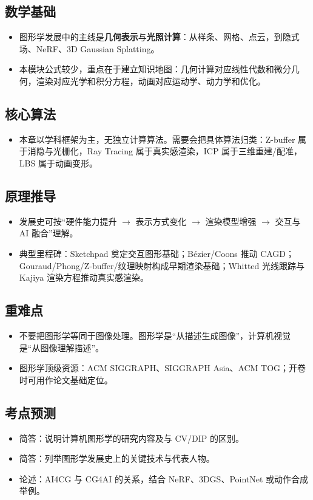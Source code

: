 \documentclass[UTF8,zihao=-4,scheme=chinese,fontset=fandol]{ctexart}
\newcommand{\key}[1]{\textbf{#1}}
\begin{document}
\subsection{数学基础}
\begin{itemize}
  \item 图形学发展中的主线是\key{几何表示}与\key{光照计算}：从样条、网格、点云，到隐式场、NeRF、3D Gaussian Splatting。
  \item 本模块公式较少，重点在于建立知识地图：几何计算对应线性代数和微分几何，渲染对应光学和积分方程，动画对应运动学、动力学和优化。
\end{itemize}

\subsection{核心算法}
\begin{itemize}
  \item 本章以学科框架为主，无独立计算算法。需要会把具体算法归类：Z-buffer 属于消隐与光栅化，Ray Tracing 属于真实感渲染，ICP 属于三维重建/配准，LBS 属于动画变形。
\end{itemize}

\subsection{原理推导}
\begin{itemize}
  \item 发展史可按“硬件能力提升 $\rightarrow$ 表示方式变化 $\rightarrow$ 渲染模型增强 $\rightarrow$ 交互与 AI 融合”理解。
  \item 典型里程碑：Sketchpad 奠定交互图形基础；Bézier/Coons 推动 CAGD；Gouraud/Phong/Z-buffer/纹理映射构成早期渲染基础；Whitted 光线跟踪与 Kajiya 渲染方程推动真实感渲染。
\end{itemize}

\subsection{重难点}
\begin{itemize}
  \item 不要把图形学等同于图像处理。图形学是“从描述生成图像”，计算机视觉是“从图像理解描述”。
  \item 图形学顶级资源：ACM SIGGRAPH、SIGGRAPH Asia、ACM TOG；开卷时可用作论文基础定位。
\end{itemize}

\subsection{考点预测}
\begin{itemize}
  \item 简答：说明计算机图形学的研究内容及与 CV/DIP 的区别。
  \item 简答：列举图形学发展史上的关键技术与代表人物。
  \item 论述：AI4CG 与 CG4AI 的关系，结合 NeRF、3DGS、PointNet 或动作合成举例。
\end{itemize}
\end{document}
